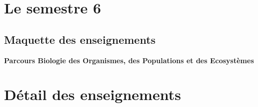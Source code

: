 \documentclass[10pt, a5paper]{report}
\begin{document}
\begin{spacing}{1.5}
\footnotesize

\section*{Le semestre 6}

\subsection*{Maquette des enseignements}

\textbf{Parcours Biologie des Organismes, des Populations et des Ecosystèmes}
\newline



\section*{Détail des enseignements}

\end{spacing}
\end{document}
